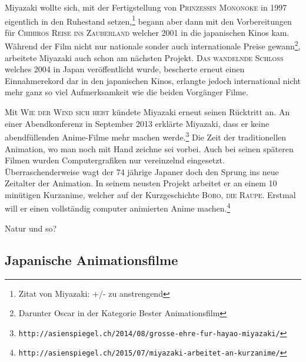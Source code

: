 Miyazaki wollte sich, mit der Fertigstellung von \textsc{Prinzessin Mononoke} in 1997 eigentlich in den Ruhestand setzen,\footnote{Zitat von Miyazaki: +/- zu anstrengend} begann aber dann mit den Vorbereitungen für \textsc{Chihiros Reise ins Zauberland} welcher 2001 in die japanischen Kinos kam. Während der Film nicht nur nationale sonder auch internationale Preise gewann\footnote{Darunter Oscar in der Kategorie Bester Animationsfilm}, arbeitete Miyazaki auch schon am nächsten Projekt. \textsc{Das wandelnde Schloss} welches 2004 in Japan veröffentlicht wurde, bescherte erneut einen Einnahmerekord dar in den japanischen Kinos, erlangte jedoch international nicht mehr ganz so viel Aufmerksamkeit wie die beiden Vorgänger Filme. 

Mit \textsc{Wie der Wind sich hebt} kündete Miyazaki erneut seinen Rücktritt an. An einer Abendkonferenz in September 2013 erklärte Miyazaki, dass er keine abendfüllenden Anime-Filme mehr machen werde.\footnote{\texttt{http://asienspiegel.ch/2014/08/grosse-ehre-fur-hayao-miyazaki/}} Die Zeit der traditionellen Animation, wo man noch mit Hand zeichne sei vorbei. Auch bei seinen späteren Filmen wurden Computergrafiken nur vereinzelnd eingesetzt. Überraschenderweise wagt der 74 jährige Japaner doch den Sprung ins neue Zeitalter der Animation. In seinem neusten Projekt arbeitet er an einem 10 minütigen Kurzanime, welcher auf der Kurzgeschichte \textsc{Boro, die Raupe}. Erstmal will er einen vollständig computer animierten Anime machen.\footnote{\texttt{http://asienspiegel.ch/2015/07/miyazaki-arbeitet-an-kurzanime/}}

Natur und so?

\subsection{Japanische Animationsfilme}
